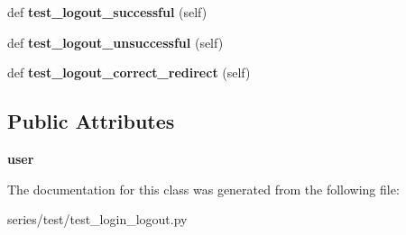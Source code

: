 \begin{DoxyCompactItemize}
def {\bfseries test\+\_\+logout\+\_\+successful} (self)
\item 
\mbox{\label{classseries_1_1test_1_1test__login__logout_1_1_login_test_a14c3efe6467130f65eac19a5d77e6888}} 
def {\bfseries test\+\_\+logout\+\_\+unsuccessful} (self)
\item 
\mbox{\label{classseries_1_1test_1_1test__login__logout_1_1_login_test_a947b04e278f7194f327f830752522bb4}} 
def {\bfseries test\+\_\+logout\+\_\+correct\+\_\+redirect} (self)
\end{DoxyCompactItemize}
\subsection*{Public Attributes}
\begin{DoxyCompactItemize}
\item 
\mbox{\label{classseries_1_1test_1_1test__login__logout_1_1_login_test_ab3950fc735dd2dde631b5d730faa3cd6}} 
{\bfseries user}
\end{DoxyCompactItemize}


The documentation for this class was generated from the following file\+:\begin{DoxyCompactItemize}
\item 
series/test/test\+\_\+login\+\_\+logout.\+py\end{DoxyCompactItemize}

